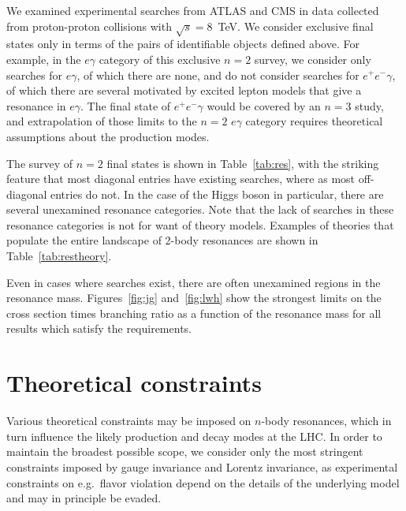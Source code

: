 We examined experimental searches from ATLAS and CMS in data collected from proton-proton collisions with $\sqrt{s}=8$~TeV.  We consider exclusive final states only in terms of the pairs of identifiable objects defined above. For example, in the $e\gamma$ category of this exclusive $n=2$ survey, we consider only searches for $e\gamma$, of which there are none, and do not consider searches for $e^+e^-\gamma$, of which there are several motivated by excited lepton models that give a resonance in $e\gamma$. The final state of $e^+e^-\gamma$ would be covered by an $n=3$ study, and extrapolation of those limits to the $n=2$ $e\gamma$ category requires theoretical assumptions about the production modes.

The survey of $n=2$ final states is shown in Table~\ref{tab:res}, with the striking feature that most diagonal entries have existing searches, where as most off-diagonal entries do not. In the case of the Higgs boson in particular, there are several unexamined resonance categories. Note that the lack of searches in these resonance categories is not for want of theory models. Examples of theories that populate the entire landscape of 2-body resonances are shown in Table~\ref{tab:restheory}.

Even in cases where searches exist, there are often unexamined regions in the resonance mass. Figures~\ref{fig:jg} and~\ref{fig:lwh} show the strongest limits on the cross section times branching ratio as a function of the resonance mass for all results which satisfy the requirements.

\section{Theoretical constraints}

Various theoretical constraints may be imposed on $n$-body resonances, which in turn influence the likely production and decay modes at the LHC. In order to maintain the broadest possible scope, we consider only the most stringent constraints imposed by gauge invariance and Lorentz invariance, as experimental constraints on e.g.~flavor violation depend on the details of the underlying model and may in principle be evaded.

